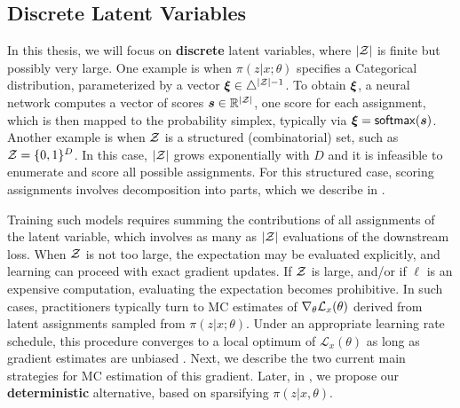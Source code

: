 \subsection{Discrete Latent Variables}\label{sec:discrete_lvm_bg}

\noindent In this thesis, we will focus on \textbf{discrete} latent variables, where
$|\mathcal{Z}|$ is finite but possibly very large. One example is when
$\pi(z|x;\theta)$ specifies a Categorical distribution, parameterized by a
vector $\bm{\xi} \in \triangle^{|\mathcal{Z}|-1}$. To obtain $\bm{\xi}$, a neural network
computes a vector of scores $\bm{s} \in \mathbb{R}^{|\mathcal{Z}|}$, one score
for each assignment, which is then mapped to the probability simplex,
typically via $\bm{\xi} = \operatorname*{\mathsf{softmax}}(\bm{s})$. Another example is when $\mathcal{Z}$ is
a structured (combinatorial) set, such as $\mathcal{Z} = \{0, 1\}^D$. In this
case, $|\mathcal{Z}|$ grows exponentially with $D$ and it is infeasible to
enumerate and score all possible assignments. For this structured
case, scoring assignments involves decomposition into parts, which
we describe in .

Training such models requires summing the contributions of all
assignments of the latent variable, which involves as many as $|\mathcal{Z}|$
evaluations of the downstream loss. When $\mathcal{Z}$ is not too large, the
expectation may be evaluated explicitly, and learning can proceed
with exact gradient updates. If $\mathcal{Z}$ is large, and/or if $\ell$ is
an expensive computation, evaluating the expectation becomes
prohibitive. In such cases, practitioners typically turn to MC
estimates of $\nabla_\theta \mathcal{L}_x(\theta)$ derived from latent
assignments sampled from $\pi(z|x;\theta)$. Under an appropriate
learning rate schedule, this procedure converges to a local optimum
of $\mathcal L_x(\theta)$ as long as gradient estimates are unbiased
\citep{robbins1951stochastic}. Next, we describe the two current main
strategies for MC estimation of this gradient. Later, in
, we propose our
\textbf{deterministic} alternative, based on sparsifying $\pi(z| x,
    \theta)$.

